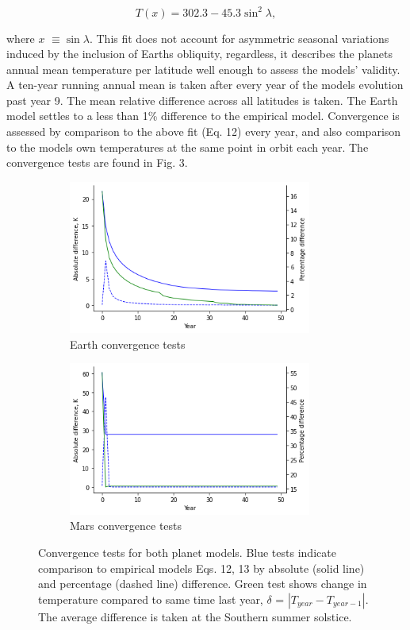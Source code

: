 \documentclass[12pt,onecolumn]{revtex4-2}    %
\begin{document}
\begin{equation}
T(x) = 302.3 - 45.3 \sin^{2}\lambda,
\end{equation}

where $x$ $\equiv \sin\lambda$. This fit does not account for asymmetric seasonal variations induced by the inclusion of Earths obliquity, regardless, it describes the planets annual mean temperature per latitude well enough to assess the models' validity. A ten-year running annual mean is taken after every year of the models evolution past year 9. The mean relative difference across all latitudes is taken. The Earth model settles to a less than 1\% difference to the empirical model. Convergence is assessed by comparison to the above fit (Eq. 12) every year, and also comparison to the models own temperatures at the same point in orbit each year. The convergence tests are found in Fig. 3.

\begin{figure}
\begin{subfigure}{.5\textwidth}
  \centering
  \includegraphics[width = 8cm]{Convergence.png}
  \caption{Earth convergence tests}
  \label{fig:sub1}
\end{subfigure}%
\begin{subfigure}{.5\textwidth}
  \centering
  \includegraphics[width=8cm]{MarsConvergence.png}
  \caption{Mars convergence tests}
  \label{fig:sub2}
\end{subfigure}
\raggedright
\caption{Convergence tests for both planet models. Blue tests indicate comparison to empirical models Eqs. 12, 13 by absolute (solid line) and percentage (dashed line) difference. Green test shows change in temperature compared to same time last year, $\delta$ = $|T_{year} - T_{year-1}|$. The average difference is taken at the Southern summer solstice.}
\label{fig:test}
\end{figure}
\end{document}
